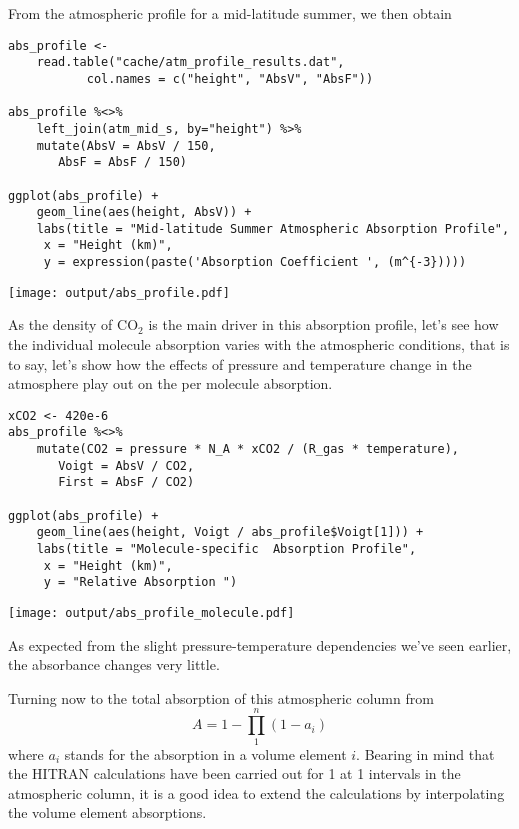 \documentclass[10pt,a4paper,titlepage]{article}
\begin{document}
From the atmospheric profile for a mid-latitude summer, we then obtain

\begin{lstlisting}
abs_profile <-
    read.table("cache/atm_profile_results.dat",
	       col.names = c("height", "AbsV", "AbsF"))

abs_profile %<>%
    left_join(atm_mid_s, by="height") %>%
    mutate(AbsV = AbsV / 150,
	   AbsF = AbsF / 150)

ggplot(abs_profile) +
    geom_line(aes(height, AbsV)) +
    labs(title = "Mid-latitude Summer Atmospheric Absorption Profile",
	 x = "Height (km)",
	 y = expression(paste('Absorption Coefficient ', (m^{-3}))))
\end{lstlisting}

\texttt{[image: output/abs\_profile.pdf]}

As the density of CO$_{\text{2}}$ is the main driver in this absorption
profile, let's see how the individual molecule absorption varies with
the atmospheric conditions, that is to say, let's show how the effects
of pressure and temperature change in the atmosphere play out on the
per molecule absorption.

\begin{lstlisting}
xCO2 <- 420e-6
abs_profile %<>%
    mutate(CO2 = pressure * N_A * xCO2 / (R_gas * temperature),
	   Voigt = AbsV / CO2,
	   First = AbsF / CO2)

ggplot(abs_profile) +
    geom_line(aes(height, Voigt / abs_profile$Voigt[1])) +
    labs(title = "Molecule-specific  Absorption Profile",
	 x = "Height (km)",
	 y = "Relative Absorption ")
\end{lstlisting}

\texttt{[image: output/abs\_profile\_molecule.pdf]}

As expected from the slight pressure-temperature dependencies we've
seen earlier, the absorbance changes very little.

Turning now to the total absorption of this atmospheric column from
\begin{equation}
A = 1 - \prod_1^n (1 - a_i)
\end{equation}
where $a_i$ stands for the absorption in a volume element $i$. Bearing
in mind that the HITRAN calculations have been carried out for
\unit{1}{\cubic\metre} at \unit{1}{\kilo\metre} intervals in the
atmospheric column, it is a good idea to extend the calculations by
interpolating the volume element absorptions.
\end{document}
